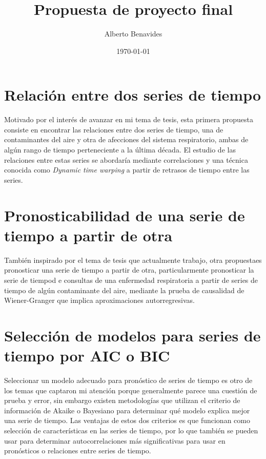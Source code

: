 \documentclass[10pt, oneside,spanish]{article}   	%
\title{Propuesta de proyecto final}
\author[ ]{Alberto Benavides}
\affil[ ]{Posgrado en Ingeniería de Sistemas}
\affil[ ]{Facultad de Ingeniería Mecánica y Eléctrica}
\affil[ ]{Universidad Autónoma de Nuevo León}
\date{\today}							%
\begin{document}
\maketitle

\section{Relación entre dos series de tiempo}

Motivado por el interés de avanzar en mi tema de tesis, esta primera propuesta consiste en encontrar las relaciones entre dos series de tiempo, una de contaminantes del aire y otra de afecciones del sistema respiratorio, ambas de algún rango de tiempo perteneciente a la última década. El estudio de las relaciones entre estas series se abordaría mediante correlaciones y una técnica conocida como \emph{Dynamic time warping} a partir de retrasos de tiempo entre las series. 

\section{Pronosticabilidad de una serie de tiempo a partir de otra}

También inspirado por el tema de tesis que actualmente trabajo, otra propuestaes pronosticar una serie de tiempo a partir de otra, particularmente pronosticar la serie de tiempod e consultas de una enfermedad respiratoria a partir de series de tiempo de algún contaminante del aire, mediante la prueba de causalidad de Wiener-Granger que implica aproximaciones autorregresivas.

\section{Selección de modelos para series de tiempo por AIC o BIC}

Seleccionar un modelo adecuado para pronóstico de series de tiempo es otro de los temas que captaron mi atención porque generalmente parece una cuestión de prueba y error, sin embargo existen metodologías que utilizan el criterio de información de Akaike o Bayesiano para determinar qué modelo explica mejor una serie de tiempo. Las ventajas de estos dos criterios es que funcionan como selección de características en las series de tiempo, por lo que también se pueden usar para determinar autocorrelaciones más significativas para usar en pronósticos o relaciones entre series de tiempo.
\end{document}
